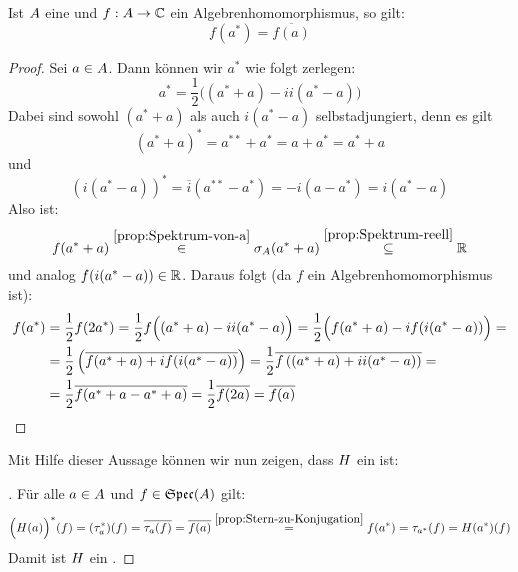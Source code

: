 \begin{prop}\label{prop:Stern-zu-Konjugation}
Ist $A$ eine \CAlg{} und $f: A \to \mathbb{C}$ ein Algebrenhomomorphismus, so gilt:
	\[f(a^*) = \overline{f(a)}\]
\end{prop}

\begin{proof}
Sei $a \in A$. Dann können wir $a^*$ wie folgt zerlegen:
	\[a^* = \frac{1}{2}\Big((a^* + a) - ii(a^* - a)\Big)\]
Dabei sind sowohl $(a^* + a)$ als auch $i(a^* - a)$ selbstadjungiert, denn es gilt
	\[(a^* + a)^* = a^{**} + a^* = a + a^* = a^* + a\]
und
	\[(i(a^* - a))^* = \overline{i}(a^{**} - a^*) = -i(a - a^*) = i(a^* - a)\]
Also ist:
	\[f(a^* + a) \overset{\ref{prop:Spektrum-von-a}}{\in} \sigma_A(a^* + a) \overset{\ref{prop:Spektrum-reell}}{\subseteq} \mathbb{R}\]
und analog $f(i(a^* - a)) \in \mathbb{R}$. Daraus folgt (da $f$ ein Algebrenhomomorphismus ist):
	\begin{align*}
	f(a^*) &= \frac{1}{2}f(2a^*) = \frac{1}{2}f\Big((a^* + a) - ii(a^* - a)\Big) = \frac{1}{2}\Big(f(a^* + a) - if(i(a^* - a))\Big) = \\
				&= \frac{1}{2}\left(\overline{f(a^* + a) + if(i(a^* - a))}\right) = \frac{1}{2}\overline{f\left((a^* + a) + ii(a^* - a)\right)} = \\
				&= \frac{1}{2}\overline{f(a^* + a - a^* + a)} = \frac{1}{2}\overline{f(2a)} = \overline{f(a)} \qedhere
	\end{align*}
\end{proof}

Mit Hilfe dieser Aussage können wir nun zeigen, dass $\AlgIso$ ein \CAlgHom{} ist:

\begin{proof}[\Bew{$\AlgIso$ \CAlgHom}]Für alle $a \in A$ und $f \in \mathfrak{Spec}(A)$ gilt:
	\[\Big(H(a)\Big)^*(f) = (\tau_a^*)(f) = \overline{\tau_a(f)} = \overline{f(a)} \overset{\ref{prop:Stern-zu-Konjugation}}{=} f(a^*) = \tau_{a^*}(f) = H(a^*)(f) \]
	Damit ist $\AlgIso$ ein \CAlgHom.
\let\qed\relax
\end{proof}